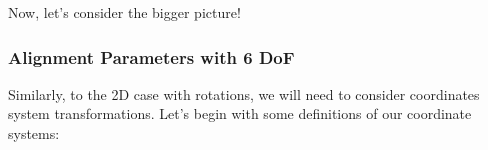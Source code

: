 \documentclass[a4paper,11pt]{article}
\begin{document}




Now, let's consider the bigger picture! 

\subsubsection{Alignment Parameters with 6 DoF}

Similarly, to the 2D case with rotations, we will need to consider coordinates system transformations. Let's begin with some definitions of our coordinate systems: 
\end{document}
